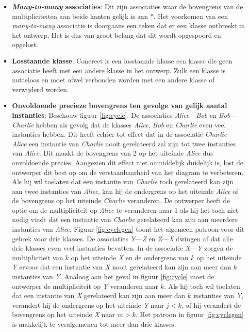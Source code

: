 \begin{itemize}
	\item \textbf{\textit{Many-to-many} associaties}: Dit zijn associaties waar de bovengrens van de multipliciteiten aan beide kanten gelijk is aan $*$. Het voorkomen van een \textit{many-to-many} associatie is doorgaans een teken dat er een klasse ontbreekt in het ontwerp. Het is dus van groot belang dat dit wordt opgespoord en opgelost.
	
	\item \textbf{Losstaande klasse}: Concreet is een losstaande klasse een klasse die geen associatie heeft met een andere klasse in het ontwerp. Zulk een klasse is nutteloos en moet ofwel verbonden worden met een andere klasse of verwijderd worden.
	
	\item \textbf{Onvoldoende precieze bovengrens ten gevolge van gelijk aantal instanties}\cite{Balaban2015}: Beschouw figuur \ref{fig:cycle}. De associaties \textit{Alice}---\textit{Bob} en \textit{Bob}---\textit{Charlie} hebben als gevolg dat de klasses \textit{Alice}, \textit{Bob} en \textit{Charlie} even veel instanties hebben. Dit heeft echter tot effect dat in de associatie \textit{Charlie}---\textit{Alice} een instantie van \textit{Charlie} nooit gerelateerd zal zijn tot twee instanties van \textit{Alice}. Dit maakt de bovengrens van 2 op het uiteinde \textit{Alice} dus onvoldoende precies. Aangezien dit effect niet onmiddelijk duidelijk is, lost de ontwerper dit best op om de verstaanbaarheid van het diagram te verbeteren. Als hij wil toelaten dat een instantie van \textit{Charlie} toch gerelateerd kan zijn aan twee instanties van \textit{Alice}, kan hij de ondergrens op het uiteinde \textit{Alice} of de bovengrens op het uiteinde \textit{Charlie} veranderen. De ontwerper heeft de optie om de multipliciteit op \textit{Alice} te veranderen naar $1$ als hij het toch niet nodig vindt dat een instantie van \textit{Charlie} gerelateerd kan zijn aan meerdere instanties van \textit{Alice}. Figuur \ref{fig:cyclegen} toont het algemeen patroon voor dit gebrek voor drie klasses. De associaties \textit{Y}---\textit{Z} en \textit{Z}---\textit{X} dwingen af dat alle drie klasses even veel instanties bevatten. In de associatie \textit{X}---\textit{Y} zorgen de multipliciteit van $k$ op het uiteinde \textit{X} en de ondergrens van $k$ op het uiteinde \textit{Y} ervoor dat een instantie van \textit{X} nooit gerelateerd kan zijn aan meer dan $k$ instanties van \textit{Y}. Analoog aan het geval in figuur \ref{fig:cycle} moet de ontwerper de multipliciteit op \textit{Y} veranderen naar $k$. Als hij toch wil toelaten dat een instantie van \textit{X} gerelateerd kan zijn aan meer dan $k$ instanties van \textit{Y}, verandert hij de ondergrens op het uiteinde \textit{Y} naar $j < k$, of hij verandert de bovengrens op het uiteinde \textit{X} naar $m > k$. Het patroon in figuur \ref{fig:cyclegen} is makkelijk te veralgemenen tot meer dan drie klasses.
\end{itemize}

